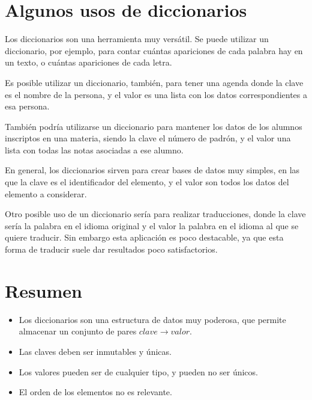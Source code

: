 \section{Algunos usos de diccionarios}

Los diccionarios son una herramienta muy versátil.  Se puede utilizar un
diccionario, por ejemplo, para contar cuántas apariciones de cada palabra
hay en un texto, o cuántas apariciones de cada letra.

Es posible utilizar un diccionario, también, para tener una agenda donde la
clave es el nombre de la persona, y el valor es una lista con los datos
correspondientes a esa persona.

También podría utilizarse un diccionario para mantener los datos de los
alumnos inscriptos en una materia, siendo la clave el número de padrón, y
el valor una lista con todas las notas asociadas a ese alumno.

En general, los diccionarios sirven para crear bases de datos muy simples,
en las que la clave es el identificador del elemento, y el valor son todos
los datos del elemento a considerar.

Otro posible uso de un diccionario sería para realizar
traducciones, donde la clave sería la palabra en el idioma original y el
valor la palabra en el idioma al que se quiere traducir.  Sin embargo esta
aplicación es poco destacable, ya que esta forma de traducir suele dar
resultados poco satisfactorios.

\section{Resumen}

\begin{itemize}
\item Los diccionarios son una estructura de datos
muy poderosa, que permite almacenar un conjunto de pares $clave \rightarrow valor$.
\item Las claves deben ser inmutables y únicas.
\item Los valores pueden ser de cualquier tipo, y pueden no ser únicos.
\item El orden de los elementos no es relevante.
\end{itemize}

